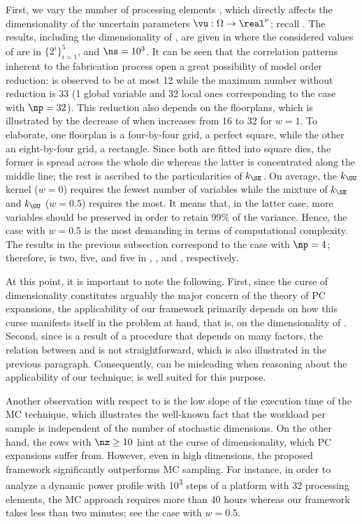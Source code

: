 First, we vary the number of processing elements \np, which directly affects the
dimensionality of the uncertain parameters $\vu: \Omega \to \real^\nu$; recall
. The results, including the dimensionality
\nz of \vz, are given in  where the
considered values of \np are in $\{ 2^i \}_{i = 1}^5$, and $\ns = 10^3$. It can
be seen that the correlation patterns inherent to the fabrication process
\cite{cheng2011} open a great possibility of model order reduction: \nz is
observed to be at most 12 while the maximum number without reduction is 33 (1
global variable and 32 local ones corresponding to the case with $\np = 32$).
This reduction also depends on the floorplans, which is illustrated by the
decrease of \nz when \np increases from 16 to 32 for $w = 1$. To elaborate, one
floorplan is a four-by-four grid, a perfect square, while the other an
eight-by-four grid, a rectangle. Since both are fitted into square dies, the
former is spread across the whole die whereas the latter is concentrated along
the middle line; the rest is ascribed to the particularities of $k_\SE$. On
average, the $k_\OU$ kernel ($w = 0$) requires the fewest number of variables
while the mixture of $k_\SE$ and $k_\OU$ ($w = 0.5$) requires the most. It means
that, in the latter case, more variables should be preserved in order to retain
99\% of the variance. Hence, the case with $w = 0.5$ is the most demanding in
terms of computational complexity. The results in the previous subsection
correspond to the case with $\np = 4$; therefore, \nz is two, five, and five in
, , and
, respectively.

At this point, it is important to note the following. First, since the curse of
dimensionality constitutes arguably the major concern of the theory of \ac{PC}
expansions, the applicability of our framework primarily depends on how this
curse manifests itself in the problem at hand, that is, on the dimensionality
\nz of \vz. Second, since \vz is a result of a procedure that depends on many
factors, the relation between \vu and \vz is not straightforward, which is also
illustrated in the previous paragraph. Consequently, \nu can be misleading when
reasoning about the applicability of our technique; \nz is well suited for this
purpose.

Another observation with respect to  is the
low slope of the execution time of the \ac{MC} technique, which illustrates the
well-known fact that the workload per sample is independent of the number of
stochastic dimensions. On the other hand, the rows with $\nz \geq 10$ hint at
the curse of dimensionality, which \ac{PC} expansions suffer from. However, even
in high dimensions, the proposed framework significantly outperforms \ac{MC}
sampling. For instance, in order to analyze a dynamic power profile with
10\textsuperscript{3} steps of a platform with 32 processing elements, the
\ac{MC} approach requires more than 40 hours whereas our framework takes less
than two minutes; see the case with $w = 0.5$.


